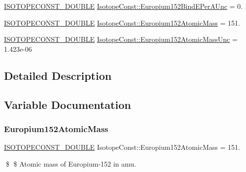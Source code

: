 \begin{DoxyCompactItemize}
\mbox{\hyperlink{group___isotope_const-_macros_ga8f45a7272ce02c0b4c65c44636ed719a}{I\+S\+O\+T\+O\+P\+E\+C\+O\+N\+S\+T\+\_\+\+D\+O\+U\+B\+LE}} \mbox{\hyperlink{group___isotope_const-_europium-_eu152_ga5db7e6a628b02c902bafe7b113495433}{Isotope\+Const\+::\+Europium152\+Bind\+E\+Per\+A\+Unc}} = 0.
\item 
\mbox{\hyperlink{group___isotope_const-_macros_ga8f45a7272ce02c0b4c65c44636ed719a}{I\+S\+O\+T\+O\+P\+E\+C\+O\+N\+S\+T\+\_\+\+D\+O\+U\+B\+LE}} \mbox{\hyperlink{group___isotope_const-_europium-_eu152_ga4b11c76842198563ce1f2d7af135a3a6}{Isotope\+Const\+::\+Europium152\+Atomic\+Mass}} = 151.
\item 
\mbox{\hyperlink{group___isotope_const-_macros_ga8f45a7272ce02c0b4c65c44636ed719a}{I\+S\+O\+T\+O\+P\+E\+C\+O\+N\+S\+T\+\_\+\+D\+O\+U\+B\+LE}} \mbox{\hyperlink{group___isotope_const-_europium-_eu152_gab055fc27d54bfa9dd507d17cfcc77218}{Isotope\+Const\+::\+Europium152\+Atomic\+Mass\+Unc}} = 1.\+423e-\/06
\end{DoxyCompactItemize}


\subsection{Detailed Description}


\subsection{Variable Documentation}
\mbox{\label{group___isotope_const-_europium-_eu152_ga4b11c76842198563ce1f2d7af135a3a6}} 
\subsubsection{\texorpdfstring{Europium152\+Atomic\+Mass}{Europium152AtomicMass}}
{\footnotesize\ttfamily \mbox{\hyperlink{group___isotope_const-_macros_ga8f45a7272ce02c0b4c65c44636ed719a}{I\+S\+O\+T\+O\+P\+E\+C\+O\+N\+S\+T\+\_\+\+D\+O\+U\+B\+LE}} Isotope\+Const\+::\+Europium152\+Atomic\+Mass = 151.}

\$ \$ Atomic mass of Europium-\/152 in amu. \mbox{\label{group___isotope_const-_europium-_eu152_gab055fc27d54bfa9dd507d17cfcc77218}} 

